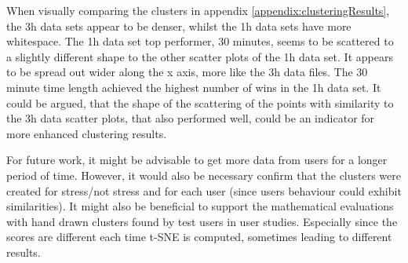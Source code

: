 When visually comparing the clusters in appendix \ref{appendix:clusteringResults}, the 3h data sets appear to be denser, whilst the 1h data sets have more whitespace. The 1h data set top performer, 30 minutes, seems to be scattered to a slightly different shape to the other scatter plots of the 1h data set. It appears to be spread out wider along the x axis, more like the 3h data files. The 30 minute time length achieved the highest number of wins in the 1h data set. It could be argued, that the shape of the scattering of the points with similarity to the 3h data scatter plots, that also performed well, could be an indicator for more enhanced clustering results.



For future work, it might be advisable to get more data from users for a longer period of time. However, it would also be necessary confirm that the clusters were created for stress/not stress and for each user (since users behaviour could exhibit similarities). It might also be beneficial to support the mathematical evaluations with hand drawn clusters found by test users in user studies. Especially since the scores are different each time t-SNE is computed, sometimes leading to different results.





 









